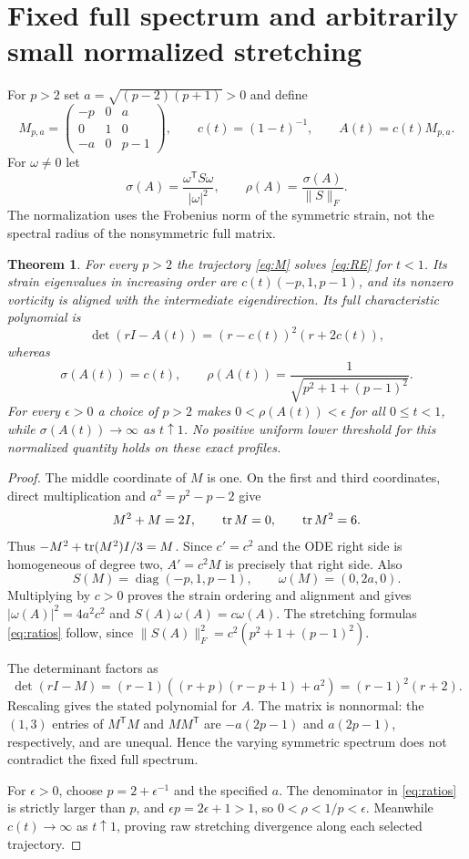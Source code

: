 \documentclass[11pt]{article}
\newtheorem{theorem}{Theorem}[section]
\begin{document}
\section{Fixed full spectrum and arbitrarily small normalized stretching}
For $p>2$ set $a=\sqrt{(p-2)(p+1)}>0$ and define
\begin{equation}\label{eq:M}
 M_{p,a}=\begin{pmatrix}-p&0&a\\0&1&0\\-a&0&p-1\end{pmatrix},
 \qquad c(t)=(1-t)^{-1},\qquad A(t)=c(t)M_{p,a}.
\end{equation}
For $\omega\ne0$ let
\[
 \sigma(A)=\frac{\omega^{\mathsf T}S\omega}{|\omega|^2},\qquad
 \rho(A)=\frac{\sigma(A)}{\|S\|_F}.
\]
The normalization uses the Frobenius norm of the symmetric strain,
not the spectral radius of the nonsymmetric full matrix.

\begin{theorem}\label{thm:family}
For every $p>2$ the trajectory \eqref{eq:M} solves \eqref{eq:RE} for
$t<1$. Its strain eigenvalues in increasing order are
$c(t)(-p,1,p-1)$, and its nonzero vorticity is aligned with the
intermediate eigendirection. Its full characteristic polynomial is
\[
 \det(rI-A(t))=(r-c(t))^2(r+2c(t)),
\]
whereas
\begin{equation}\label{eq:ratios}
 \sigma(A(t))=c(t),\qquad
 \rho(A(t))=\frac1{\sqrt{p^2+1+(p-1)^2}}.
\end{equation}
For every $\epsilon>0$ a choice of $p>2$ makes
$0<\rho(A(t))<\epsilon$ for all $0\leq t<1$, while
$\sigma(A(t))\to\infty$ as $t\uparrow1$. No positive uniform lower
threshold for this normalized quantity holds on these exact profiles.
\end{theorem}
\begin{proof}
The middle coordinate of $M$ is one. On the first and third coordinates,
direct multiplication and $a^2=p^2-p-2$ give
\[
 M^2+M=2I,\qquad \operatorname{tr} M=0,\qquad \operatorname{tr} M^2=6.
\]
Thus $-M^2+\operatorname{tr}(M^2)I/3=M$. Since $c'=c^2$ and the ODE right side
is homogeneous of degree two, $A'=c^2M$ is precisely that right side.
Also
\[
 S(M)=\operatorname{diag}(-p,1,p-1),\qquad \omega(M)=(0,2a,0).
\]
Multiplying by $c>0$ proves the strain ordering and alignment and gives
$|\omega(A)|^2=4a^2c^2$ and $S(A)\omega(A)=c\omega(A)$.
The stretching formulas \eqref{eq:ratios} follow, since
$\|S(A)\|_F^2=c^2(p^2+1+(p-1)^2)$.

The determinant factors as
\[
 \det(rI-M)=(r-1)((r+p)(r-p+1)+a^2)=(r-1)^2(r+2).
\]
Rescaling gives the stated polynomial for $A$. The matrix is nonnormal:
the $(1,3)$ entries of $M^{\mathsf T}M$ and $MM^{\mathsf T}$ are
$-a(2p-1)$ and $a(2p-1)$, respectively, and are unequal.
Hence the varying symmetric spectrum does not contradict the fixed
full spectrum.

For $\epsilon>0$, choose $p=2+\epsilon^{-1}$ and the specified $a$.
The denominator in \eqref{eq:ratios} is strictly larger than $p$, and
$\epsilon p=2\epsilon+1>1$, so $0<\rho<1/p<\epsilon$.
Meanwhile $c(t)\to\infty$ as $t\uparrow1$, proving raw stretching
divergence along each selected trajectory.
\end{proof}
\end{document}
